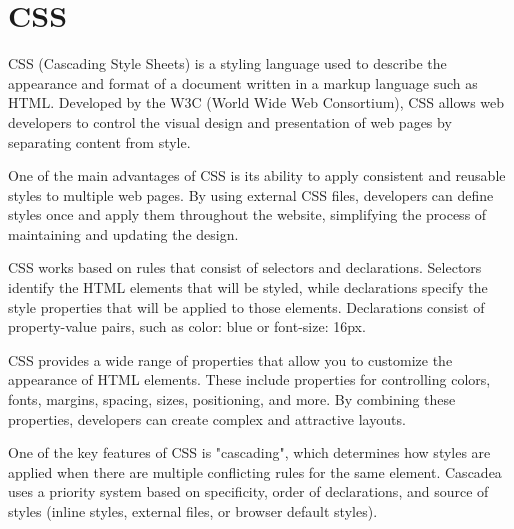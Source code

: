 \section{CSS}
\label{sec:ch3sec14}
CSS (Cascading Style Sheets) is a styling language used to describe the appearance and format of a document written in a markup language such as HTML. Developed by the W3C (World Wide Web Consortium), CSS allows web developers to control the visual design and presentation of web pages by separating content from style.

One of the main advantages of CSS is its ability to apply consistent and reusable styles to multiple web pages. By using external CSS files, developers can define styles once and apply them throughout the website, simplifying the process of maintaining and updating the design.

CSS works based on rules that consist of selectors and declarations. Selectors identify the HTML elements that will be styled, while declarations specify the style properties that will be applied to those elements. Declarations consist of property-value pairs, such as color: blue or font-size: 16px.

CSS provides a wide range of properties that allow you to customize the appearance of HTML elements. These include properties for controlling colors, fonts, margins, spacing, sizes, positioning, and more. By combining these properties, developers can create complex and attractive layouts.

One of the key features of CSS is "cascading", which determines how styles are applied when there are multiple conflicting rules for the same element. Cascadea uses a priority system based on specificity, order of declarations, and source of styles (inline styles, external files, or browser default styles).

